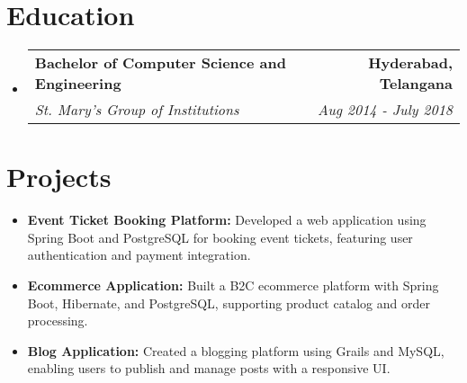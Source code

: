 \documentclass[letterpaper,10pt]{article}
\makeatletter
\newcommand{\resumeSubheading}[4]{
  \vspace{-2pt}\item
    \begin{tabular*}{1.0\textwidth}[t]{l@{\extracolsep{\fill}}r}
      \textbf{#1} & \textbf{\small #2} \\
      \textit{\small#3} & \textit{\small #4} \\
    \end{tabular*}\vspace{-5pt}
}
\newcommand{\resumeProjectItem}[2]{
  \item\small{
    \textbf{#1:} #2 \vspace{-1pt}
  }
}
\newcommand{\resumeSubHeadingListStart}{\begin{itemize}[leftmargin=0.0in, label={}]}
\newcommand{\resumeSubHeadingListEnd}{\end{itemize}}
\newcommand{\resumeItemListStart}{\begin{itemize}[leftmargin=0.1in, itemsep=1pt]}
\newcommand{\resumeItemListEnd}{\end{itemize}\vspace{-3pt}}
\makeatother
\begin{document}
\section{\color{airforceblue}Education}
\resumeSubHeadingListStart
\resumeSubheading
{Bachelor of Computer Science and Engineering}{Hyderabad, Telangana}
{St. Mary's Group of Institutions}{Aug 2014 - July 2018}
\resumeSubHeadingListEnd

\section{\color{airforceblue}Projects}
\resumeItemListStart
\resumeProjectItem{Event Ticket Booking Platform}{Developed a web application using Spring Boot and PostgreSQL for booking event tickets, featuring user authentication and payment integration.}
\resumeProjectItem{Ecommerce Application}{Built a B2C ecommerce platform with Spring Boot, Hibernate, and PostgreSQL, supporting product catalog and order processing.}
\resumeProjectItem{Blog Application}{Created a blogging platform using Grails and MySQL, enabling users to publish and manage posts with a responsive UI.}
\resumeItemListEnd
\end{document}
